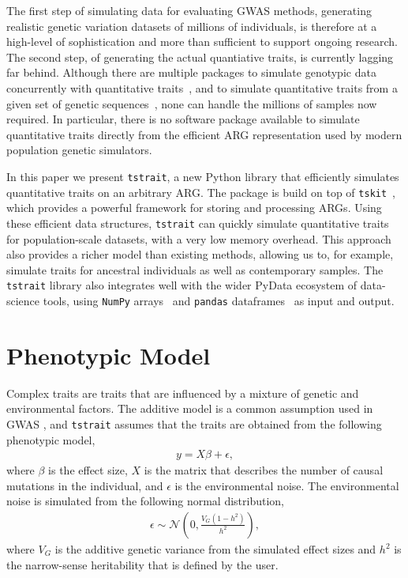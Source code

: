\documentclass[unnumsec,webpdf,modern,large,namedate]{oup-authoring-template}%
\begin{document}
The first step of simulating data for evaluating GWAS methods,
generating realistic genetic variation datasets of millions
of individuals, is therefore at a high-level of sophistication
and more than sufficient to support ongoing research.
The second step, of generating the actual quantiative traits,
is currently lagging far behind.
Although there are multiple packages to simulate genotypic data
concurrently with quantitative traits~\citep{gaynor2021,haller2023},
and to simulate quantitative traits from a given set of genetic
sequences~\citep[e.g.][]{meyer2018,fernandes2020}, none can
handle the millions of samples now required.
In particular, there is no software package available to simulate quantitative
traits directly from the efficient ARG representation used by
modern population genetic simulators.

In this paper we present \texttt{tstrait}, a new Python library that
efficiently simulates quantitative traits on an arbitrary ARG.
The package is build on top of
\texttt{tskit}~\citep{ralph2020}, which provides a powerful
framework for storing and processing ARGs.
Using these efficient data structures, \texttt{tstrait} can
quickly simulate quantitative traits for population-scale datasets,
with a very low memory overhead. This approach also provides a
richer model than existing methods,
allowing us to, for example, simulate traits for
ancestral individuals as well as contemporary samples.
The \texttt{tstrait} library also integrates well with the wider
PyData ecosystem of data-science tools,
using
\texttt{NumPy} arrays~\citep{numpy} and
\texttt{pandas} dataframes~\citep{pandas}
as input and output.

\section{Phenotypic Model}

Complex traits are traits that are influenced by a mixture of genetic and
environmental factors. The additive model is a common assumption used in GWAS
\citep{uffelmann2021}, and \texttt{tstrait} assumes that the traits are
obtained from the following phenotypic model,
\begin{align}\label{eq:additive-model}
    y=X\beta+\epsilon,
\end{align}
where $\beta$ is the effect size, $X$ is the matrix that describes the number
of causal mutations in the individual, and $\epsilon$ is the environmental
noise. The environmental noise is simulated from the following normal
distribution,
\begin{align}\label{eq:env}
    \epsilon\sim \mathcal{N}\left(0,\frac{V_G(1-h^2)}{h^2}\right),
\end{align}
where $V_G$ is the additive genetic variance from the simulated effect sizes
and $h^2$ is the narrow-sense heritability that is defined by the user.
\end{document}
